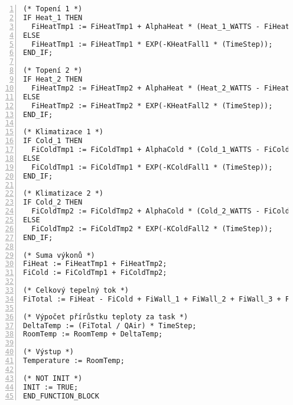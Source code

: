 \begin{lstlisting}[language=ST, breaklines=true, numbers=left, numberstyle=\small, numbersep=10pt, frame=single, basicstyle=\ttfamily\small, caption={Definice funkčního bloku fbRoomTempMod}, label={lst:fbRoomTempMod}]
(* Topení 1 *)
IF Heat_1 THEN
  FiHeatTmp1 := FiHeatTmp1 + AlphaHeat * (Heat_1_WATTS - FiHeatTmp1);
ELSE
  FiHeatTmp1 := FiHeatTmp1 * EXP(-KHeatFall1 * (TimeStep));
END_IF;

(* Topení 2 *)
IF Heat_2 THEN
  FiHeatTmp2 := FiHeatTmp2 + AlphaHeat * (Heat_2_WATTS - FiHeatTmp2);
ELSE
  FiHeatTmp2 := FiHeatTmp2 * EXP(-KHeatFall2 * (TimeStep));
END_IF;

(* Klimatizace 1 *)
IF Cold_1 THEN
  FiColdTmp1 := FiColdTmp1 + AlphaCold * (Cold_1_WATTS - FiColdTmp1);
ELSE
  FiColdTmp1 := FiColdTmp1 * EXP(-KColdFall1 * (TimeStep));
END_IF;

(* Klimatizace 2 *)
IF Cold_2 THEN
  FiColdTmp2 := FiColdTmp2 + AlphaCold * (Cold_2_WATTS - FiColdTmp2);
ELSE
  FiColdTmp2 := FiColdTmp2 * EXP(-KColdFall2 * (TimeStep));
END_IF;

(* Suma výkonů *)
FiHeat := FiHeatTmp1 + FiHeatTmp2;
FiCold := FiColdTmp1 + FiColdTmp2;

(* Celkový tepelný tok *)
FiTotal := FiHeat - FiCold + FiWall_1 + FiWall_2 + FiWall_3 + FiWall_4 + FiFloor + FiCeiling;

(* Výpočet přírůstku teploty za task *)
DeltaTemp := (FiTotal / QAir) * TimeStep;
RoomTemp := RoomTemp + DeltaTemp;

(* Výstup *)
Temperature := RoomTemp;

(* NOT INIT *)
INIT := TRUE;
END_FUNCTION_BLOCK
\end{lstlisting}